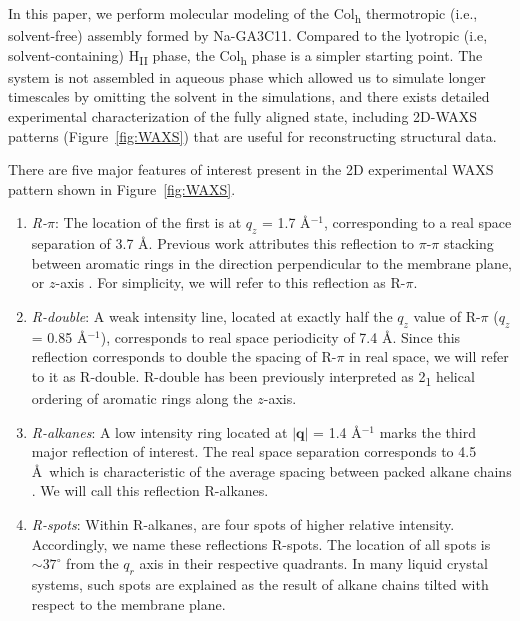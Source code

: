 \documentclass[journal=jpcbfk,manuscript=article]{achemso}
\begin{document}
  In this paper, we perform molecular modeling of the Col\textsubscript{h}
  thermotropic (i.e., solvent-free) assembly formed by Na-GA3C11. Compared to the
  lyotropic (i.e, solvent-containing) H\textsubscript{II} phase, the
  Col\textsubscript{h} phase is a simpler starting point. The system is not
  assembled in aqueous phase which allowed us to simulate longer timescales by
  omitting the solvent in the simulations, and there exists detailed experimental
  characterization of the fully aligned state, including 2D-WAXS patterns
  (Figure~\ref{fig:WAXS}) that are useful for reconstructing structural data. 
  
  There are five major features of interest present in the 2D experimental
  WAXS pattern shown in Figure~\ref{fig:WAXS}.

  \begin{enumerate} 
  
	\item \textit{R-$\pi$}: The location of the first is at $q_z$ = 1.7
	\AA$^{-1}$, corresponding to a real space separation of 3.7 {\AA}. Previous
	work attributes this reflection to $\pi$-$\pi$
	stacking between aromatic rings in the direction perpendicular to the membrane
	plane, or $z$-axis \cite{feng_scalable_2014}. For simplicity, we will refer to
	this reflection as R-$\pi$.
 
	\item \textit{R-double}: A weak intensity line, located at exactly half
	the $q_z$ value of R-$\pi$ ($q_z$ = 0.85 \AA$^{-1}$), corresponds to real
	space periodicity of 7.4 \AA. Since this reflection corresponds to double
	the spacing of R-$\pi$ in real space, we will refer to it as R-double. 
	R-double has been previously interpreted as 2\textsubscript{1} helical ordering of aromatic
	rings along the $z$-axis\cite{feng_scalable_2014}.

	\item \textit{R-alkanes}: A low intensity ring located at $|\mathbf{q}|$ = 1.4
	\AA$^{-1}$ marks the third major reflection of interest. The real space
	separation corresponds to 4.5 \AA~which is characteristic of the average
	spacing between packed alkane chains \cite{mcintosh_organization_1980}. We will
	call this reflection R-alkanes.

	\item \textit{R-spots}: Within R-alkanes, are four spots of higher
	relative intensity.  Accordingly, we name these reflections R-spots. The
	location of all spots is $\sim37^{\circ}$ from the $q_r$ axis in their
	respective quadrants. In many liquid crystal systems, such spots are explained
	as the result of alkane chains tilted with respect to the membrane
	plane\cite{govind_simple_2001}.
 

\end{enumerate}
\end{document}
